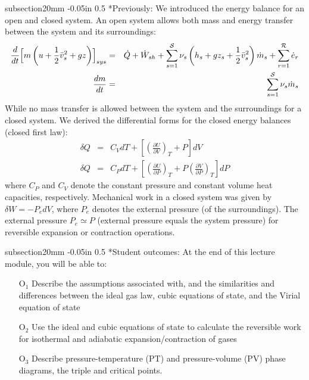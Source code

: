 \documentclass[11pt]{article}
\makeatletter
\theoremstyle{definition}
\renewcommand\subsection{\@startsection
	{subsection}{2}{0mm}
	{-0.05in}
	{0.5\baselineskip}
	{\normalfont\normalsize\bfseries}}
\makeatother
\begin{document}
\begin{mdframed}[backgroundcolor=lgray]
\subsection*{Previously:}
\noindent We introduced the energy balance for an open and closed system.
An open system allows both mass and energy transfer between the system and its surroundings:
\begin{eqnarray*}\label{eqn:general-open-balance}
	\frac{d}{dt}\Bigl[m\left(u+\frac{1}{2}\bar{v}_{s}^{2}+gz\right)\Bigr]_{sys} &=& \dot{Q}+\dot{W}_{sh}+
	\sum_{s=1}^{\mathcal{S}}\nu_{s}\left(h_{s}+gz_{s}+\frac{1}{2}\bar{v}_{s}^{2}\right)\dot{m}_{s}+
	\sum_{r=1}^{\mathcal{R}}\dot{e}_{r}\\\label{eqn:total-mass-balance}
	\frac{dm}{dt} &=& \sum_{s=1}^{\mathcal{S}}\nu_{s}\dot{m}_{s}
\end{eqnarray*}
While no mass transfer is allowed between the system and the surroundings for a closed system.
We derived the differential forms for the closed energy balances (closed first law):
\begin{eqnarray*}
	\delta{Q} &=& C_{V}dT+\left[\left(\frac{\partial U}{\partial V}\right)_{T}+P\right]dV\\
	\delta{Q} &=& C_{P}dT+\left[\left(\frac{\partial U}{\partial P}\right)_{T}+P\left(\frac{\partial V}{\partial P}\right)_{T}\right]dP
\end{eqnarray*}where $C_{P}$ and $C_{V}$ denote the constant pressure and constant volume heat capacities, respectively.
Mechanical work in a closed system was given by $\delta{W}=-P_{e}dV$, where $P_{e}$ denotes the external pressure (of the surroundings).
The external pressure $P_{e}\simeq P$ (external pressure equals the system pressure) for reversible expansion or contraction operations.

\subsection*{Student outcomes:}
At the end of this lecture module, you will be able to:
\begin{itemize}
  \item[O$_1$]{Describe the assumptions associated with, and the similarities and differences between the ideal gas law, cubic equations of state, and the Virial equation of state}
  \item[O$_2$]{Use the ideal and cubic equations of state to calculate the reversible work for isothermal and adiabatic expansion/contraction of gases}
  \item[O$_3$]{Describe pressure-temperature (PT) and pressure-volume (PV) phase diagrams, the triple and critical points.}
\end{itemize}
\end{mdframed}
\end{document}
